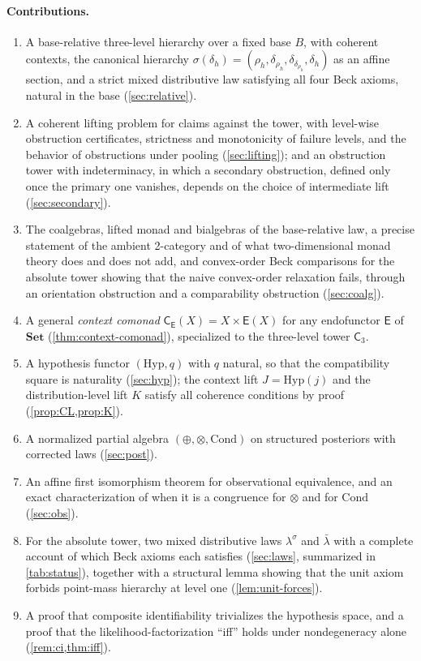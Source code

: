 \documentclass[11pt]{article}
\theoremstyle{definition}
\theoremstyle{remark}
\newcommand{\Set}{\mathbf{Set}}
\newcommand{\Hyp}{\mathrm{Hyp}}
\newcommand{\Cond}{\mathrm{Cond}}
\newcommand{\C}{\mathsf{C}}
\newcommand{\E}{\mathsf{E}}
\newcommand{\lb}{\bar\lambda}
\newcommand{\ls}{\lambda^{\sigma}}
\begin{document}
\paragraph{Contributions.}
\begin{enumerate}[leftmargin=*]
\item A base-relative three-level hierarchy over a fixed base $B$, with coherent contexts, the
  canonical hierarchy $\sigma(\delta_h)=(\rho_h,\delta_{\rho_h},\delta_{\delta_{\rho_h}},\delta_h)$ as an
  affine section, and a strict mixed distributive law satisfying all four Beck axioms, natural in the
  base (\cref{sec:relative}).
\item A coherent lifting problem for claims against the tower, with level-wise obstruction
  certificates, strictness and monotonicity of failure levels, and the behavior of obstructions under
  pooling (\cref{sec:lifting}); and an obstruction tower with indeterminacy, in which a secondary
  obstruction, defined only once the primary one vanishes, depends on the choice of intermediate lift
  (\cref{sec:secondary}).
\item The coalgebras, lifted monad and bialgebras of the base-relative law, a precise statement of
  the ambient 2-category and of what two-dimensional monad theory does and does not add, and
  convex-order Beck comparisons for the absolute tower showing that the naive convex-order
  relaxation fails, through an orientation obstruction and a comparability obstruction
  (\cref{sec:coalg}).
\item A general \emph{context comonad} $\C_\E(X)=X\times\E(X)$ for any endofunctor $\E$ of $\Set$
  (\cref{thm:context-comonad}), specialized to the three-level tower $\C_3$.
\item A hypothesis functor $(\Hyp,q)$ with $q$ natural, so that the compatibility square is
  naturality (\cref{sec:hyp}); the context lift $J=\Hyp(j)$ and the distribution-level lift $K$
  satisfy all coherence conditions by proof (\cref{prop:CL,prop:K}).
\item A normalized partial algebra $(\oplus,\otimes,\Cond)$ on structured posteriors with corrected
  laws (\cref{sec:post}).
\item An affine first isomorphism theorem for observational equivalence, and an exact
  characterization of when it is a congruence for $\otimes$ and for $\Cond$ (\cref{sec:obs}).
\item For the absolute tower, two mixed distributive laws $\ls$ and $\lb$ with a complete account
  of which Beck axioms each satisfies (\cref{sec:laws}, summarized in \cref{tab:status}), together with a structural lemma
  showing that the unit axiom forbids point-mass hierarchy at level one (\cref{lem:unit-forces}).
\item A proof that composite identifiability trivializes the hypothesis space, and a proof that the
  likelihood-factorization ``iff'' holds under nondegeneracy alone (\cref{rem:ci,thm:iff}).
\end{enumerate}
\end{document}

